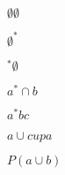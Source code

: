 \begin{tightlist}
\item $\emptyset \emptyset$
\item $\emptyset^*$
\item ${}^*\emptyset$
\item $a^* \cap b$
\item $a^* bc$
\item $a \cup cup a$  
\item $P(a \cup b)$
\end{tightlist}
